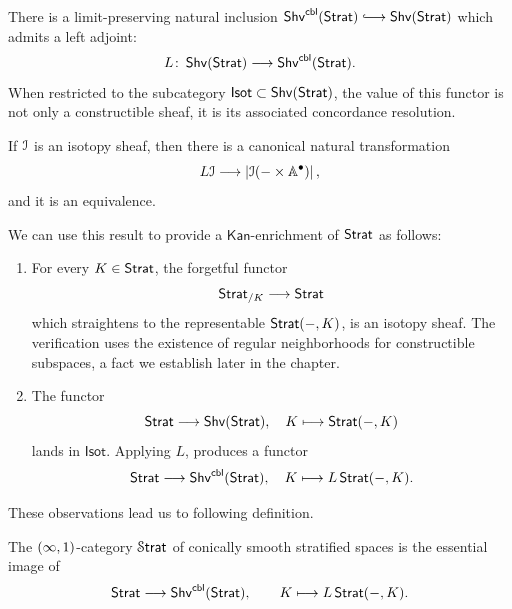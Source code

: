 There is a limit-preserving natural inclusion $\shv^{\cbl}(\strat) \xlonghookra{\;\;} \shv(\strat)$ which admits a left adjoint:
\begin{equation}
    L\colon \operatorname{\sf Shv}(\operatorname{\mathsf{Strat}}) \longrightarrow \operatorname{\sf Shv}^{\operatorname{\mathsf{cbl}}}(\operatorname{\mathsf{Strat}}).
\end{equation}
When restricted to the subcategory $\mathsf{Isot}\subset \operatorname{\sf Shv}(\operatorname{\mathsf{Strat}})$, the value of this functor is not only a constructible sheaf, it is its associated concordance resolution.
\begin{proposition}\cite[Lemma~2.3.16]{AFR1}\label{ch4:: def: isotopy sheaf realizes to cbl}
    If $\mathcal I$ is an isotopy sheaf, then there is a canonical natural transformation 
    \begin{equation}
        L\mathcal I \longrightarrow \left| \mathcal I(-\times \mathbb A^\bullet) \right|,
    \end{equation}
    and it is an equivalence.
\end{proposition} 
We can use this result to provide a $\mathsf{Kan}$-enrichment of $\operatorname{\mathsf{Strat}}$ as follows:
\begin{enumerate}
    \item For every $K\in \operatorname{\mathsf{Strat}}$, the forgetful functor 
    \begin{equation}
        \operatorname{\mathsf{Strat}}_{/K} \longrightarrow \operatorname{\mathsf{Strat}}
    \end{equation} 
    which straightens to the representable $\operatorname{\mathsf{Strat}}(-,K)$, is an isotopy sheaf. The verification uses the existence of regular neighborhoods for constructible subspaces, a fact we establish later in the chapter.
    \item  The functor
    \begin{equation}
        \operatorname{\mathsf{Strat}} \longrightarrow \operatorname{\sf Shv}(\operatorname{\mathsf{Strat}}), \quad K \longmapsto \operatorname{\mathsf{Strat}}(-,K)
    \end{equation}
    lands in $\mathsf{Isot}$. Applying $L$, produces a functor 
    \begin{equation}
        \operatorname{\mathsf{Strat}} \longrightarrow \operatorname{\sf Shv}^{\operatorname{\mathsf{cbl}}}(\operatorname{\mathsf{Strat}}), \quad K \longmapsto L\operatorname{\mathsf{Strat}}(-,K).
    \end{equation}
\end{enumerate}
These observations lead us to following definition.
\begin{definition}\cite[Definition~2.4.2]{AFR1}
    The $(\operatorname{\infty},1)$-category $\operatorname{\mathcal S\mathsf{trat}}$ of conically smooth stratified spaces is the essential image of 
    \begin{equation}
    \operatorname{\mathsf{Strat}} \longrightarrow \operatorname{\sf Shv}^{\operatorname{\mathsf{cbl}}}(\operatorname{\mathsf{Strat}}), \qquad K \longmapsto L\operatorname{\mathsf{Strat}}(-,K).
    \end{equation}
\end{definition}
